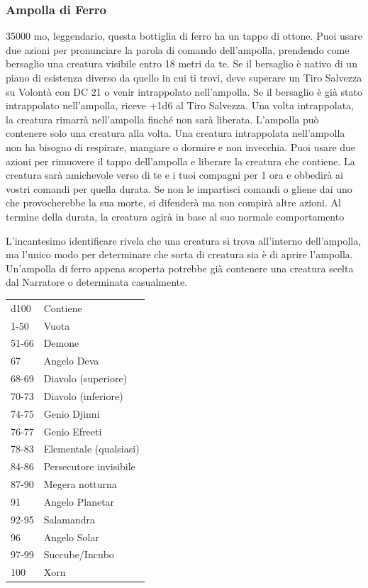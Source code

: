 \begin{multicols}{2}
	\subsubsection*{Ampolla di Ferro}
	35000 mo, leggendario, questa bottiglia di ferro ha un tappo di ottone. Puoi usare due azioni per pronunciare la parola di comando dell'ampolla, prendendo come bersaglio una creatura visibile entro 18 metri da te. Se il bersaglio è nativo di un piano di esistenza diverso da quello in cui ti trovi, deve superare un Tiro Salvezza su Volontà con DC 21 o venir intrappolato nell'ampolla. Se il bersaglio è già stato intrappolato nell'ampolla, riceve +1d6 al Tiro Salvezza. Una volta intrappolata, la creatura rimarrà nell'ampolla finché non sarà liberata. L'ampolla può contenere solo una creatura alla volta. Una creatura intrappolata nell'ampolla non ha bisogno di respirare, mangiare o dormire e non invecchia. Puoi usare due azioni per rimuovere il tappo dell'ampolla e liberare la creatura che contiene. La creatura sarà amichevole verso di te e i tuoi compagni per 1 ora e obbedirà ai vostri comandi per quella durata. Se non le impartisci comandi o gliene dai uno che provocherebbe la sua morte, si difenderà ma non compirà altre azioni. Al termine della durata, la creatura agirà in base al suo normale comportamento

	L'incantesimo identificare rivela che una creatura si trova all'interno dell'ampolla, ma l'unico modo per determinare che sorta di creatura sia è di aprire l'ampolla. Un'ampolla di ferro appena scoperta potrebbe già contenere una creatura scelta dal Narratore o determinata casualmente.

	\medskip

	\begin{tabular}{ll}
		\hline
		d100 &Contiene\\
		1-50 &Vuota\\
		51-66 &Demone \\
		67 &Angelo Deva\\
		68-69 &Diavolo (superiore)\\
		70-73 &Diavolo (inferiore)\\
		74-75 &Genio Djinni\\
		76-77 &Genio Efreeti\\
		78-83 &Elementale (qualsiasi)\\
		84-86 &Persecutore invisibile\\
		87-90 &Megera notturna\\
		91 &Angelo Planetar\\
		92-95 &Salamandra\\
		96 &Angelo Solar\\
		97-99 &Succube/Incubo\\
		100 &Xorn\\
	\end{tabular}
	\medskip



\end{multicols}
